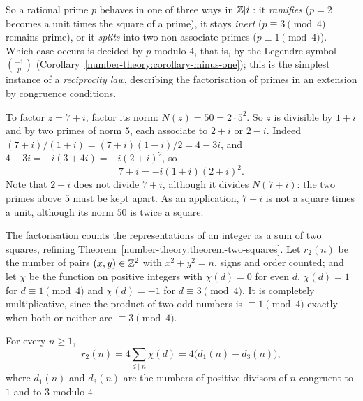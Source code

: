 So a rational prime $p$ behaves in one of three ways in $\mathbb{Z}[i]$: it \emph{ramifies} ($p = 2$ becomes a unit times the square of a prime), it stays \emph{inert} ($p \equiv 3 \pmod 4$ remains prime), or it
\emph{splits} into two non-associate primes ($p \equiv 1 \pmod 4$). Which case occurs is decided by $p$ modulo $4$, that is, by the Legendre symbol $(\frac{-1}{p})$
(Corollary~\ref{number-theory:corollary-minus-one}); this is the simplest instance of a \emph{reciprocity law}, describing the factorisation of primes in an extension by congruence conditions.

\begin{example}\label{number-theory:example-gaussian-factorisation}
To factor $z = 7 + i$, factor its norm: $N(z) = 50 = 2 \cdot 5^2$. So $z$ is divisible by $1 + i$ and by two primes of norm $5$, each associate to $2 + i$ or $2 - i$. Indeed
$(7 + i)/(1 + i) = (7 + i)(1 - i)/2 = 4 - 3i$, and $4 - 3i = -i(3 + 4i) = -i(2 + i)^2$, so
\[
7 + i = -i(1 + i)(2 + i)^2 .
\]
Note that $2 - i$ does not divide $7 + i$, although it divides $N(7 + i)$: the two primes above $5$ must be kept apart. As an application, $7 + i$ is not a square times a unit, although its norm $50$ is
twice a square.
\end{example}

The factorisation counts the representations of an integer as a sum of two squares, refining Theorem~\ref{number-theory:theorem-two-squares}. Let $r_2(n)$ be the number of pairs
$(x, y) \in \mathbb{Z}^2$ with $x^2 + y^2 = n$, signs and order counted; and let $\chi$ be the function on positive integers with $\chi(d) = 0$ for even $d$, $\chi(d) = 1$ for $d \equiv 1 \pmod 4$ and
$\chi(d) = -1$ for $d \equiv 3 \pmod 4$. It is completely multiplicative, since the product of two odd numbers is $\equiv 1 \pmod 4$ exactly when both or neither are $\equiv 3 \pmod 4$.

\begin{theorem}\label{number-theory:theorem-jacobi-two-squares}
For every $n \geq 1$,
\[
r_2(n) = 4\sum_{d \mid n}\chi(d) = 4\bigl(d_1(n) - d_3(n)\bigr),
\]
where $d_1(n)$ and $d_3(n)$ are the numbers of positive divisors of $n$ congruent to $1$ and to $3$ modulo $4$.
\end{theorem}

